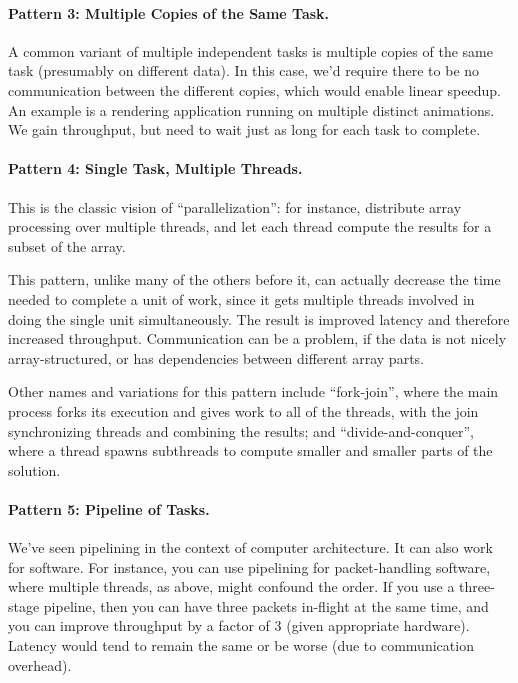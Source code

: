 \documentclass[a4paper]{report}
\begin{document}
\paragraph{Pattern 3: Multiple Copies of the Same Task.} A common variant of
multiple independent tasks is multiple copies of the same task
(presumably on different data). In this case, we'd require there to be
no communication between the different copies, which would enable
linear speedup. An example is a rendering application running on
multiple distinct animations. We gain throughput, but need to wait
just as long for each task to complete.

\paragraph{Pattern 4: Single Task, Multiple Threads.} This is the classic
vision of ``parallelization'': for instance, distribute array
processing over multiple threads, and let each thread compute the
results for a subset of the array.

This pattern, unlike many of the others before it, can actually
decrease the time needed to complete a unit of work, since it gets
multiple threads involved in doing the single unit simultaneously.
The result is improved latency and therefore increased throughput.
Communication can be a problem, if the data is not nicely
array-structured, or has dependencies between different array parts.

Other names and variations for this pattern include ``fork-join'',
where the main process forks its execution and gives work to all of
the threads, with the join synchronizing threads and combining the
results; and ``divide-and-conquer'', where a thread spawns subthreads
to compute smaller and smaller parts of the solution.

\paragraph{Pattern 5: Pipeline of Tasks.} We've seen pipelining in the context of
computer architecture. It can also work for software. For instance,
you can use pipelining for packet-handling software, where multiple
threads, as above, might confound the order. If you use a three-stage
pipeline, then you can have three packets in-flight at the same time,
and you can improve throughput by a factor of 3 (given appropriate
hardware).  Latency would tend to remain the same or be worse (due to
communication overhead).
\end{document}
